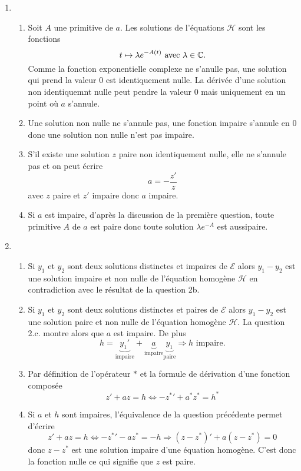 \begin{enumerate}
 \item
\begin{enumerate}
 \item Soit $A$ une primitive de $a$. Les solutions de l'équations $\mathcal{H}$ sont les fonctions 
 \[
  t \mapsto \lambda e^{-A(t)} \text{ avec } \lambda \in \mathbb{C}.
 \]
Comme la fonction exponentielle complexe ne s'anulle pas, une solution qui prend la valeur $0$ est identiquement nulle. La dérivée d'une solution non identiquemnt nulle peut pendre la valeur $0$ mais uniquement en un point où $a$ s'annule.
 \item Une solution non nulle ne s'annule pas, une fonction impaire s'annule en $0$ donc une solution non nulle n'est pas impaire.
 \item S'il existe une solution $z$ paire non identiquement nulle, elle ne s'annule pas et on peut écrire
\[
 a = - \frac{z'}{z}
\]
avec $z$ paire et $z'$ impaire donc $a$ impaire.
 \item Si $a$ est impaire, d'après la discussion de la première question, toute primitive $A$ de $a$ est paire donc toute solution $\lambda e^{-A}$ est aussipaire. 
\end{enumerate}

 \item
\begin{enumerate}
 \item Si $y_1$ et $y_2$ sont deux solutions distinctes et impaires de $\mathcal{E}$ alors $y_1-y_2$ est une solution impaire et non nulle de l'équation homogène $\mathcal{H}$ en contradiction avec le résultat de la question 2b.
 \item Si $y_1$ et $y_2$ sont deux solutions distinctes et paires de $\mathcal{E}$ alors $y_1-y_2$ est une solution paire et non nulle de l'équation homogène $\mathcal{H}$. La question 2.c. montre alors que $a$ est impaire. De plus
 \[
  h = \underset{\text{impaire}}{\underbrace{y_1'}} + \underset{\text{impaire}}{\underbrace{a}} \underset{\text{paire}}{\underbrace{y_1}} \Rightarrow h \text{ impaire}.
 \]

 \item Par définition de l'opérateur $*$ et la formule de dérivation d'une fonction composée
\[
 z' + a z = h \Leftrightarrow -{z^*}' + a^* z^* = h^*
\]

 \item Si $a$ et $h$ sont impaires, l'équivalence de la question précédente permet d'écrire
\[
 z' + a z = h \Leftrightarrow -{z^*}' - a z^* = -h 
 \Rightarrow (z-z^*)' + a(z-z^*) = 0
\]
donc $z-z^*$ est une solution impaire d'une équation homogène. C'est donc la fonction nulle ce qui signifie que $z$ est paire.


\end{enumerate}
\end{enumerate}
